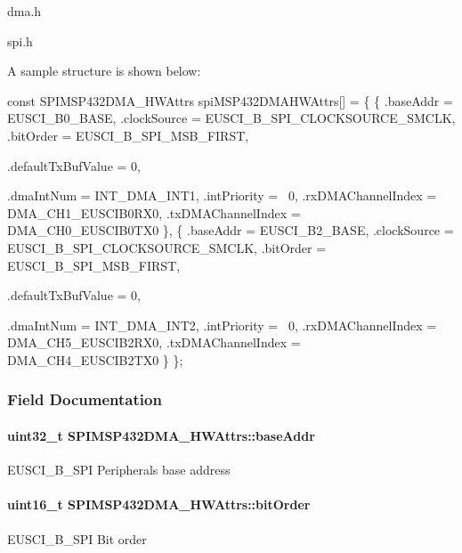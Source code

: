 \begin{DoxyItemize}
\item dma.\+h
\item spi.\+h
\end{DoxyItemize}

A sample structure is shown below\+: 
\begin{DoxyCode}
\textcolor{keyword}{const} SPIMSP432DMA_HWAttrs spiMSP432DMAHWAttrs[] = \{
    \{
        .baseAddr = EUSCI\_B0\_BASE,
        .clockSource = EUSCI\_B\_SPI\_CLOCKSOURCE\_SMCLK,
        .bitOrder = EUSCI\_B\_SPI\_MSB\_FIRST,

        .defaultTxBufValue = 0,

        .dmaIntNum = INT\_DMA\_INT1,
        .intPriority = ~0,
        .rxDMAChannelIndex = DMA\_CH1\_EUSCIB0RX0,
        .txDMAChannelIndex = DMA\_CH0\_EUSCIB0TX0
    \},
    \{
        .baseAddr = EUSCI\_B2\_BASE,
        .clockSource = EUSCI\_B\_SPI\_CLOCKSOURCE\_SMCLK,
        .bitOrder = EUSCI\_B\_SPI\_MSB\_FIRST,

        .defaultTxBufValue = 0,

        .dmaIntNum = INT\_DMA\_INT2,
        .intPriority = ~0,
        .rxDMAChannelIndex = DMA\_CH5\_EUSCIB2RX0,
        .txDMAChannelIndex = DMA\_CH4\_EUSCIB2TX0
    \}
\};
\end{DoxyCode}
 

\subsubsection{Field Documentation}
\paragraph[{base\+Addr}]{\setlength{\rightskip}{0pt plus 5cm}uint32\+\_\+t S\+P\+I\+M\+S\+P432\+D\+M\+A\+\_\+\+H\+W\+Attrs\+::base\+Addr}\label{struct_s_p_i_m_s_p432_d_m_a___h_w_attrs_ac717a44bf8e6f70118fc8802bb79a1b8}
E\+U\+S\+C\+I\+\_\+\+B\+\_\+\+S\+P\+I Peripheral\textquotesingle{}s base address 
\paragraph[{bit\+Order}]{\setlength{\rightskip}{0pt plus 5cm}uint16\+\_\+t S\+P\+I\+M\+S\+P432\+D\+M\+A\+\_\+\+H\+W\+Attrs\+::bit\+Order}\label{struct_s_p_i_m_s_p432_d_m_a___h_w_attrs_ac3af678c0dbd1595ff87dea784278edf}
E\+U\+S\+C\+I\+\_\+\+B\+\_\+\+S\+P\+I Bit order 
